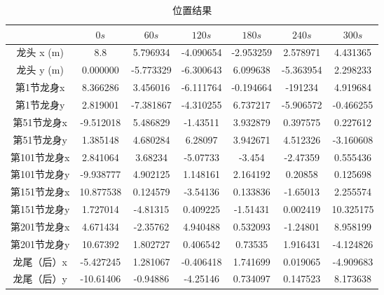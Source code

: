 \documentclass[withoutpreface,bwprint]{cumcmthesis1} %
\begin{document}
\begin{table}[h!]
    \caption{位置结果}
    \centering
    \begin{tabular}{|c|c|c|c|c|c|c|}
    \hline
     & $0s$ & $60s$ & $120s$ & $180s$ & $240s$ & $300s$ \\
    \hline
    龙头 x (m) &8.8&5.796934&-4.090654&-2.953259&2.578971&4.431365 \\
    \hline
    龙头 y (m) & 0.000000 & -5.773329 & -6.300643 & 6.099638 &-5.363954&2.298233 \\
    \hline
     第1节龙身x& 8.366286&3.456016 & -6.111764 &-0.194664 & -191234  & 4.919684 \\
    \hline
     第1节龙身y& 2.819001 & -7.381867 &-4.310255  & 6.737217 & -5.906572&-0.466255  \\
    \hline
     第51节龙身x& -9.512018 & 5.486829 & -1.43511 & 3.932879 & 0.397575 & 0.227612 \\
    \hline
     第51节龙身y& 1.385148&4.680284& 6.28097   & 3.942671 & 4.512326 & -3.160608 \\
    \hline
     第101节龙身x& 2.841064 & 3.68234 & -5.07733 & -3.454 & -2.47359 & 0.555436 \\
    \hline
     第101节龙身y& -9.938777& 4.902125 & 1.148161& 2.164192 & 0.20858 & 0.125698 \\
    \hline
     第151节龙身x& 10.877538& 0.124579 & -3.54136 & 0.133836 & -1.65013 & 2.255574 \\
    \hline
     第151节龙身y& 1.727014& -4.81315 & 0.409225 & -1.51431 & 0.002419& 10.325175 \\
    \hline
     第201节龙身x& 4.671434 & -2.35762 & 4.940488 & 0.532093 & -1.24801 & 8.958199 \\
    \hline
     第201节龙身y& 10.67392 & 1.802727 & 0.406542 & 0.73535 & 1.916431 & -4.124826 \\
    \hline
     龙尾（后）x& -5.427245 & 1.281067 & -0.406418 & 1.741699 & 0.019065 & -4.909683 \\
    \hline
     龙尾（后）y& -10.61406 & -0.94886 & -4.25146 & 0.734097 & 0.147523 & 8.173638 \\
    \hline
    \end{tabular}
    \label{tab:example}
    \end{table}
\end{document}
